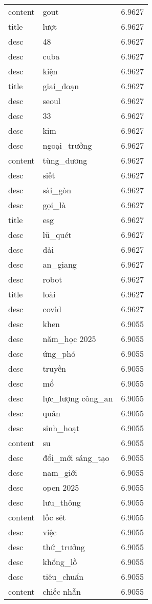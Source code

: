 \documentclass{article}
\begin{document}
\begin{tabular}{lll}
content & gout & 6.9627\\
title & lượt & 6.9627\\
desc & 48 & 6.9627\\
desc & cuba & 6.9627\\
desc & kiện & 6.9627\\
title & giai\_đoạn & 6.9627\\
desc & seoul & 6.9627\\
desc & 33 & 6.9627\\
desc & kim & 6.9627\\
desc & ngoại\_trưởng & 6.9627\\
content & tùng\_dương & 6.9627\\
desc & siết & 6.9627\\
desc & sài\_gòn & 6.9627\\
desc & gọi\_là & 6.9627\\
title & esg & 6.9627\\
desc & lũ\_quét & 6.9627\\
desc & dải & 6.9627\\
desc & an\_giang & 6.9627\\
desc & robot & 6.9627\\
title & loài & 6.9627\\
desc & covid & 6.9627\\
desc & khen & 6.9055\\
desc & năm\_học 2025 & 6.9055\\
desc & ứng\_phó & 6.9055\\
desc & truyền & 6.9055\\
desc & mổ & 6.9055\\
desc & lực\_lượng công\_an & 6.9055\\
desc & quân & 6.9055\\
desc & sinh\_hoạt & 6.9055\\
content & su & 6.9055\\
desc & đổi\_mới sáng\_tạo & 6.9055\\
desc & nam\_giới & 6.9055\\
desc & open 2025 & 6.9055\\
desc & lưu\_thông & 6.9055\\
content & lốc sét & 6.9055\\
desc & việc & 6.9055\\
desc & thứ\_trưởng & 6.9055\\
desc & khổng\_lồ & 6.9055\\
desc & tiêu\_chuẩn & 6.9055\\
content & chiếc nhẫn & 6.9055\\

\end{tabular}
\end{document}

